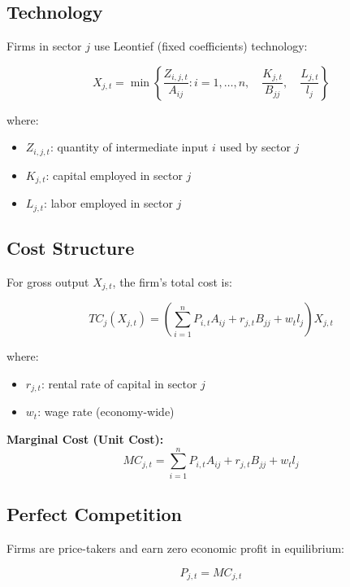 \documentclass[12pt,a4paper]{article}
\theoremstyle{definition}
\theoremstyle{remark}
\begin{document}
\subsection{Technology}

Firms in sector $j$ use Leontief (fixed coefficients) technology:

\begin{equation}
    X_{j,t} = \min\left\{ \frac{Z_{i,j,t}}{A_{ij}} : i=1,\ldots,n, \quad \frac{K_{j,t}}{B_{jj}}, \quad \frac{L_{j,t}}{l_j} \right\}
\end{equation}

where:
\begin{itemize}
    \item $Z_{i,j,t}$: quantity of intermediate input $i$ used by sector $j$
    \item $K_{j,t}$: capital employed in sector $j$
    \item $L_{j,t}$: labor employed in sector $j$
\end{itemize}

\subsection{Cost Structure}

For gross output $X_{j,t}$, the firm's total cost is:

\begin{equation}
    TC_j(X_{j,t}) = \left(\sum_{i=1}^n P_{i,t} A_{ij} + r_{j,t} B_{jj} + w_t l_j\right) X_{j,t}
\end{equation}

where:
\begin{itemize}
    \item $r_{j,t}$: rental rate of capital in sector $j$
    \item $w_t$: wage rate (economy-wide)
\end{itemize}

\textbf{Marginal Cost (Unit Cost):}
\begin{equation}
    MC_{j,t} = \sum_{i=1}^n P_{i,t} A_{ij} + r_{j,t} B_{jj} + w_t l_j
\end{equation}

\subsection{Perfect Competition}

Firms are price-takers and earn zero economic profit in equilibrium:

\begin{equation}
    P_{j,t} = MC_{j,t}
\end{equation}
\end{document}
